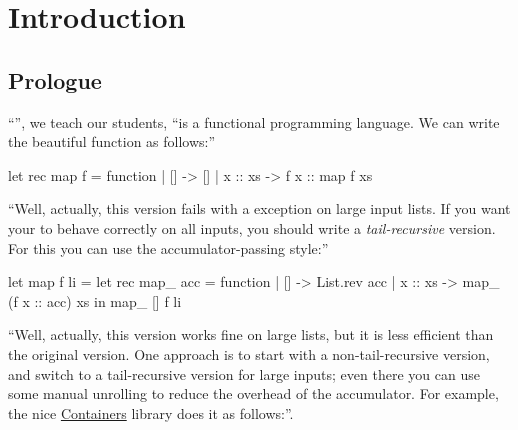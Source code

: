 \section{Introduction}

\subsection{Prologue}

``\OCaml'', we teach our students, ``is a functional programming language. We can write the beautiful function  as follows:''
\begin{Ocaml}
let rec map f = function
| [] -> []
| x :: xs -> f x :: map f xs
\end{Ocaml}

``Well, actually, this version fails with a 
exception on large input lists. If you want your  to behave
correctly on all inputs, you should write a \emph{tail-recursive}
version. For this you can use the accumulator-passing style:''
\begin{Ocaml}
let map f li =
  let rec map_ acc = function
  | [] -> List.rev acc
  | x :: xs -> map_ (f x :: acc) xs
  in map_ [] f li
\end{Ocaml}

``Well, actually, this version works fine on large lists, but it is
less efficient than the original version. One approach is to start with
a non-tail-recursive version, and switch to a tail-recursive version
for large inputs; even there you can use some manual unrolling to
reduce the overhead of the accumulator. For example, the nice
\href{https://github.com/c-cube/ocaml-containers}{Containers} library
does it as follows:''.

